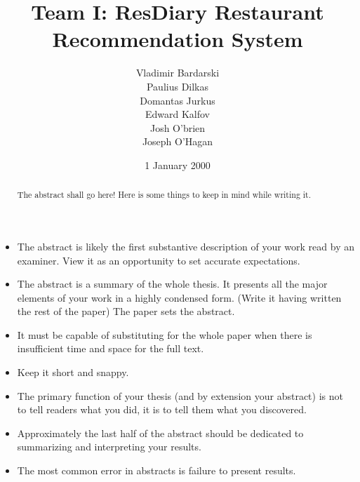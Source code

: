 \documentclass{l3proj}
\begin{document}
\title{Team I: ResDiary Restaurant Recommendation System}

\author{Vladimir Bardarski \\
        Paulius Dilkas \\
        Domantas Jurkus \\
        Edward Kalfov \\
        Josh O'brien \\
		Joseph O'Hagan}

\date{1 January 2000}

\maketitle

\begin{abstract}
The abstract shall go here! Here is some things to keep in mind while writing it.
\end{abstract}

\begin{itemize}
\item The abstract is likely the first substantive description of your work read by an examiner. View it as an opportunity to set accurate expectations.
\item The abstract is a summary of the whole thesis. It presents all the major elements of your work in a highly condensed form. (Write it having written the rest of the paper) The paper sets the abstract.
\item It must be capable of substituting for the whole paper when there is insufficient time and space for the full text.
\item Keep it short and snappy. 
\item The primary function of your thesis (and by extension your abstract) is not to tell readers what you did, it is to tell them what you discovered.
\item Approximately the last half of the abstract should be dedicated to summarizing and interpreting your results.
\item The most common error in abstracts is failure to present results.
\end{itemize}

\educationalconsent

\newpage

\end{document}
